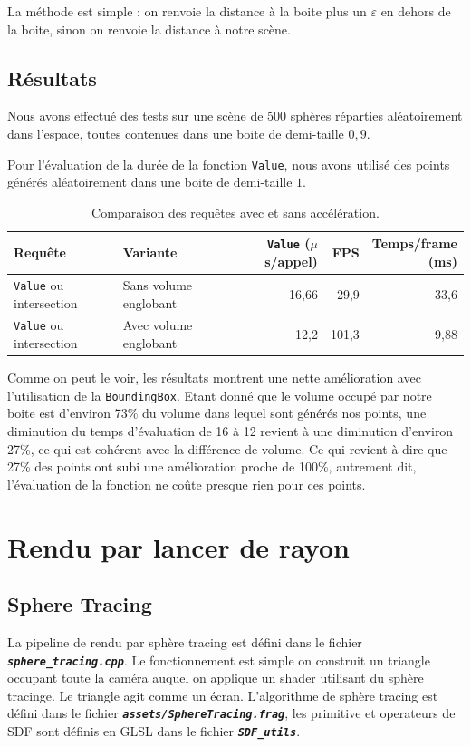 \documentclass[11pt,a4paper]{article}
\newcommand{\filename}[1]{\textbf{\textit{\texttt{#1}}}}
\begin{document}
La méthode est simple : on renvoie la distance à la boite plus un $\varepsilon$ en dehors de la boite, sinon on renvoie la distance à notre scène.

\subsection{Résultats}
Nous avons effectué des tests sur une scène de 500 sphères réparties aléatoirement dans l'espace, toutes contenues dans une boite de demi-taille $0{,}9$.

Pour l'évaluation de la durée de la fonction \texttt{Value}, nous avons utilisé des points générés aléatoirement dans une boite de demi-taille $1$.

\begin{table}[htbp]
  \centering
  \caption{Comparaison des requêtes avec et sans accélération.}
  \label{tab:acceleration}
  \small
  \begin{tabular}{p{3.2cm}p{3.3cm}rrr}
    \toprule
    Requête & Variante & \shortstack{\texttt{Value}\\($\mu$s/appel)} & FPS & \shortstack{Temps/frame\\(ms)} \\
    \midrule
    \texttt{Value} ou intersection & Sans volume englobant & 16,66 & 29,9 & 33,6 \\
    \texttt{Value} ou intersection & Avec volume englobant & 12,2 & 101,3 & 9,88 \\
    \bottomrule
  \end{tabular}
\end{table}

Comme on peut le voir, les résultats montrent une nette amélioration avec l'utilisation de la \texttt{BoundingBox}.
Etant donné que le volume occupé par notre boite est d'environ 73\% du volume dans lequel sont générés nos points, une diminution 
du temps d'évaluation de 16 à 12 revient à une diminution d'environ 27\%, ce qui est cohérent avec la différence de volume.
Ce qui revient à dire que 27\% des points ont subi une amélioration proche de 100\%, autrement dit, l'évaluation de la fonction
ne coûte presque rien pour ces points.

\section{Rendu par lancer de rayon}
\subsection{Sphere Tracing}
La pipeline de rendu par sphère tracing est défini dans le fichier \filename{sphere\_tracing.cpp}. Le fonctionnement est simple on construit un triangle occupant toute la caméra auquel on applique un shader utilisant du sphère tracinge.
Le triangle agit comme un écran. L'algorithme de sphère tracing est défini dans le fichier \filename{assets/SphereTracing.frag}, les primitive et operateurs de SDF sont définis en GLSL dans le fichier \filename{SDF\_utils}.
\end{document}
